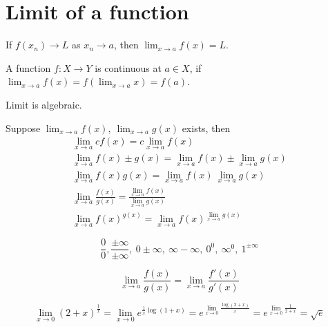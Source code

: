 \section{Limit of a function}
\begin{definition}[limit]
	If $f(x_n) \to L$ as $x_n \to a$, then $\displaystyle \lim_{x \to a} f(x) = L$.
\end{definition}

\begin{definition}[continuity]
	A function $f : X \to Y$ is continuous at $a \in X$, if $\displaystyle \lim_{x \to a} f(x) = f(\lim_{x \to a} x) = f(a)$.
\end{definition}

\begin{theorem}
	Limit is algebraic.
\end{theorem}
	Suppose $\displaystyle \lim_{x \to a} f(x),\ \lim_{x \to a} g(x)$ exists, then
\begin{eqnarray}
	\lim_{x \to a} cf(x) = c\lim_{x \to a} f(x) \\
	\lim_{x \to a} f(x) \pm g(x) = \lim_{x \to a} f(x) \pm \lim_{x \to a}g(x) \\
	\lim_{x \to a} f(x)g(x) = \lim_{x \to a}f(x) \ \lim_{x \to a}g(x) \\
	\lim_{x \to a} \frac{f(x)}{g(x)} = \frac{\displaystyle \lim_{x \to a}f(x)}{\displaystyle \lim_{x \to a}g(x)} \\
	\lim_{x \to a} f(x)^{g(x)} = \lim_{x \to a}f(x)^{\displaystyle \lim_{x \to a}g(x)}
\end{eqnarray}

\begin{remark}[exceptions]
	\[ \frac{0}{0}, \frac{\pm \infty}{\pm \infty},\ 0 \pm \infty,\ \infty - \infty,\ 0^0,\ \infty^0,\ 1^{\pm\infty} \]
\end{remark}

\begin{theorem}
	\[ \lim_{x \to a} \frac{f(x)}{g(x)} = \lim_{x \to a} \frac{f'(x)}{g'(x)} \]
\end{theorem}


\begin{remark}[application]
	\[ \lim_{x \to 0} (2+x)^\frac{1}{x} = \lim_{x \to 0} e^{\frac{1}{x} \log (1+x)} = e^{\displaystyle \lim_{x \to 0} \frac{\log(2+x)}{x}} = e^{\displaystyle \lim_{x \to 0} \frac{1}{2+x}} = \sqrt{e} \]
\end{remark}

